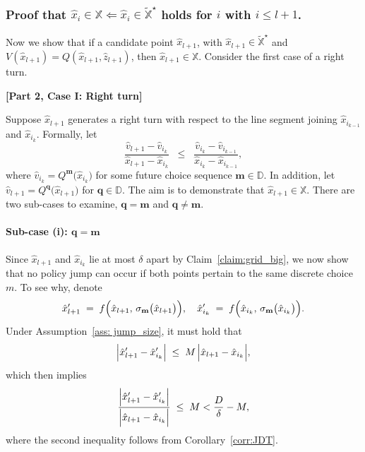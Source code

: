 \documentclass[12pt]{article}
\newcommand{\mVecVar}{\mathbf{m}}
\newcommand{\qVecVar}{\mathbf{q}}
\begin{document}

\subsubsection{Proof that $\hat{x}_{i} \in \mathbb{X} \Longleftarrow  \hat{x}_{i} \in \widetilde{\mathbb{X}}^{\star} $ holds for $i$ with $i\leq l+1$.}

Now we show that if a candidate point $\hat{x}_{l+1}$, with $\hat{x}_{l+1}\in \widetilde{\mathbb{X}}^{\star}$ and $ V(\hat{x}_{l+1}) = Q(\hat{x}_{l+1},\hat{z}_{l+1})$, then $\hat{x}_{l+1}\in \mathbb{X}$. Consider the first case of a right turn. 

\textbf{[Part 2, Case I: Right turn]}

Suppose $\hat{x}_{l+1}$ generates a right turn with respect to the line segment joining $\hat{x}_{i_{k-1}}$ and $\hat{x}_{i_{k}}$. Formally, let
%
\begin{equation}\label{eq:rt_slope}
    \frac{\hat{v}_{l+1} - \hat{v}_{i_{k}}}{\hat{x}_{l+1} - \hat{x}_{i_{k}}}
    \;\;\le\;\;
    \frac{\hat{v}_{i_{k}} - \hat{v}_{i_{k-1}}}{\hat{x}_{i_{k}}-\hat{x}_{i_{k-1}}},
\end{equation}
%
where $\hat{v}_{i_{k}} = Q^{\mVecVar}\bigl(\hat{x}_{i_{k}}\bigr)$ for some future choice sequence $\mVecVar\in\mathbb{D}$.  In addition, let $\hat{v}_{l+1} = Q^{\qVecVar}\bigl(\hat{x}_{l+1}\bigr)$ for $\qVecVar\in \mathbb{D}$.  The aim is to demonstrate that $\hat{x}_{l+1} \in \mathbb{X}$. There are two sub-cases to examine, $\qVecVar = \mVecVar$ and $\qVecVar \neq \mVecVar$.

\paragraph{Sub-case (i): $\qVecVar = \mVecVar$} Since $\hat{x}_{l+1}$ and $\hat{x}_{i_{k}}$ lie at most $\delta$ apart by Claim~\ref{claim:grid_big}, we now show that no policy jump can occur if both points pertain to the same discrete choice $m$.  To see why, denote
\begin{equation*}
   \hat{x}_{l+1}' 
   \;=\; 
   f\Bigl(\hat{x}_{l+1},\,\sigma_{\mVecVar}\bigl(\hat{x}_{l+1}\bigr)\Bigr),
   \quad
   \hat{x}_{i_{k}}' 
   \;=\; 
   f\Bigl(\hat{x}_{i_{k}},\,\sigma_{\mVecVar}\bigl(\hat{x}_{i_{k}}\bigr)\Bigr).
\end{equation*}
%
Under Assumption~\ref{ass: jump_size}, it must hold that 
%
\begin{equation}
   \Bigl|\hat{x}_{l+1}' - \hat{x}_{i_{k}}'\Bigr|
   \;\le\; 
   M\,\Bigl|\hat{x}_{l+1} - \hat{x}_{i_{k}}\Bigr|,
\end{equation}
%
which then implies
%
\begin{equation}
   \frac{\Bigl|\hat{x}_{l+1}' - \hat{x}_{i_{k}}'\Bigr|}
        {\Bigl|\hat{x}_{l+1} - \hat{x}_{i_{k}}\Bigr|}
   \;\le\; 
   M< \frac{D}{\delta}-M, 
\end{equation}
%
where the second inequality follows from Corollary~\ref{corr:JDT}.
\end{document}

